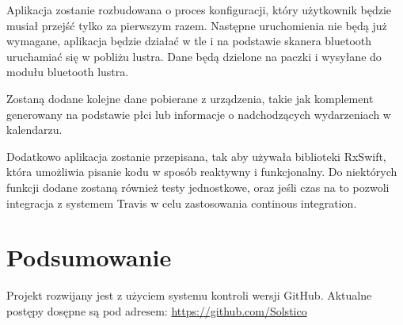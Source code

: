 \documentclass[a4paper,11pt]{article}
\begin{document}
Aplikacja zostanie rozbudowana o proces konfiguracji, który użytkownik będzie musiał przejść tylko za pierwszym razem. Następne uruchomienia nie będą już wymagane, aplikacja będzie działać w tle i na podstawie skanera bluetooth uruchamiać się w pobliżu lustra. Dane będą dzielone na paczki i wysyłane do modułu bluetooth lustra.

Zostaną dodane kolejne dane pobierane z urządzenia, takie jak komplement generowany na podstawie płci lub informacje o nadchodzących wydarzeniach w kalendarzu.

Dodatkowo aplikacja zostanie przepisana, tak aby używała biblioteki RxSwift, która umożliwia pisanie kodu w sposób reaktywny i funkcjonalny. Do niektórych funkcji dodane zostaną również testy jednostkowe, oraz jeśli czas na to pozwoli integracja z systemem Travis w celu zastosowania continous integration.
	
	
\section{Podsumowanie}
	Projekt rozwijany jest z użyciem systemu kontroli wersji GitHub. Aktualne postępy dosępne są pod adresem: \url{https://github.com/Solstico}
	
	
	
	
	
	
\end{document}
